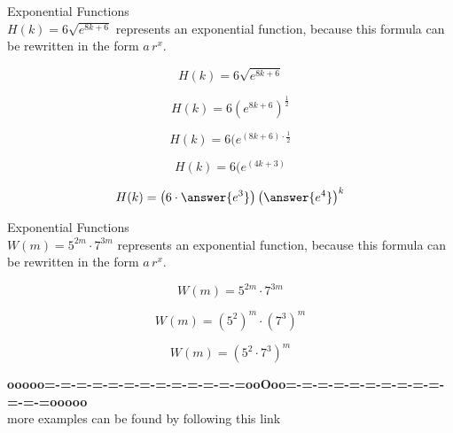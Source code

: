 \documentclass{ximera}
\begin{document}
\begin{example}  Exponential Functions \\



$H(k) = 6 \sqrt{e^{8 k + 6}} $ represents an exponential function, because this formula can be rewritten in the form $a \, r^x$.   \\


\begin{explanation}


\[
H(k) = 6 \sqrt{e^{8 k + 6}}
\]


\[
H(k) = 6 (e^{8 k + 6})^{\tfrac{1}{2}}
\]

\[
H(k) = 6 (e^{(8 k + 6) \cdot \tfrac{1}{2}}
\]

\[
H(k) = 6 (e^{(4 k + 3)}
\]

\[
H(k) = \left( 6 \cdot \answer{e^3} \right) \left( \answer{e^4} \right)^k
\]


\end{explanation}

\end{example}

















\begin{example}  Exponential Functions \\



$W(m) = 5^{2 m} \cdot 7^{3 m}$ represents an exponential function, because this formula can be rewritten in the form $a \, r^x$.   \\


\begin{explanation}


\[
W(m) = 5^{2 m} \cdot 7^{3 m}
\]


\[
W(m) = \left( 5^2 \right)^m \cdot \left( 7^3 \right)^m
\]

\[
W(m) = \left( 5^2 \cdot 7^3 \right)^m 
\]




\end{explanation}

\end{example}









\begin{center}
\textbf{\textcolor{green!50!black}{ooooo=-=-=-=-=-=-=-=-=-=-=-=-=ooOoo=-=-=-=-=-=-=-=-=-=-=-=-=ooooo}} \\

more examples can be found by following this link\\ 

\end{center}
\end{document}
